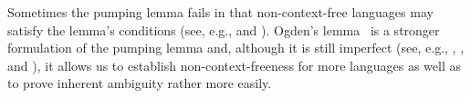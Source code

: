 
\begin{construction}
Sometimes the pumping lemma fails in that non-context-free languages may satisfy the lemma's conditions (see, e.g., \citet{Wise1976StrongPumpingLemmaCFLs} and \citet{Horvath1978LanguagesSatisfyingBarHillel}). Ogden's lemma~\citeyearpar{Ogden1968ProvingInherentAmbiguity} is a stronger formulation of the pumping lemma and, although it is still imperfect (see, e.g., \citet{Boasson1978LanguagesSatisfyingOgdensLemma}, \citet{BaderMoura1982GeneralizationOgdensLemma}, and \citet{Kracht2004TooManyLanguagesOgden}), it allows us to establish non-context-freeness for more languages as well as to prove inherent ambiguity rather more easily.
\end{construction}